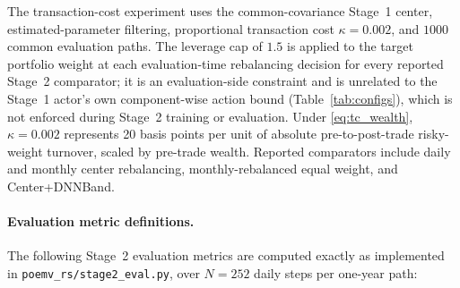 \documentclass[a4paper,10pt]{article}
\begin{document}
The transaction-cost experiment uses the common-covariance Stage~1 center, estimated-parameter filtering, proportional transaction cost $\kappa=0.002$, and $1000$ common evaluation paths. The leverage cap of $1.5$ is applied to the target portfolio weight at each evaluation-time rebalancing decision for every reported Stage~2 comparator; it is an evaluation-side constraint and is unrelated to the Stage~1 actor's own component-wise action bound (Table~\ref{tab:configs}), which is not enforced during Stage~2 training or evaluation. Under \eqref{eq:tc_wealth}, $\kappa=0.002$ represents 20 basis points per unit of absolute pre-to-post-trade risky-weight turnover, scaled by pre-trade wealth. Reported comparators include daily and monthly center rebalancing, monthly-rebalanced equal weight, and Center+DNNBand.

\paragraph{Evaluation metric definitions.} The following Stage~2 evaluation metrics are computed exactly as implemented in \texttt{poemv\_rs/stage2\_eval.py}, over $N=252$ daily steps per one-year path:
\end{document}
